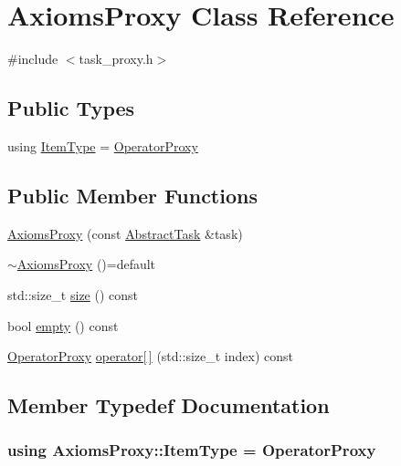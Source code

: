 \hypertarget{classAxiomsProxy}{\section{Axioms\-Proxy Class Reference}
\label{classAxiomsProxy}
}


{\ttfamily \#include $<$task\-\_\-proxy.\-h$>$}

\subsection*{Public Types}
\begin{DoxyCompactItemize}
\item 
using \hyperlink{classAxiomsProxy_abefbb803d0603832ce3784793040cc30}{Item\-Type} = \hyperlink{classOperatorProxy}{Operator\-Proxy}
\end{DoxyCompactItemize}
\subsection*{Public Member Functions}
\begin{DoxyCompactItemize}
\item 
\hyperlink{classAxiomsProxy_aa06ac71778563a60523ec3e7fae56ef1}{Axioms\-Proxy} (const \hyperlink{classAbstractTask}{Abstract\-Task} \&task)
\item 
\hyperlink{classAxiomsProxy_a1f0a596925691361d514e875546dfebc}{$\sim$\-Axioms\-Proxy} ()=default
\item 
std\-::size\-\_\-t \hyperlink{classAxiomsProxy_aea7209589c94878185298ddf3a328720}{size} () const 
\item 
bool \hyperlink{classAxiomsProxy_ab246c21d3176f9c7f2d713a1d31c65dc}{empty} () const 
\item 
\hyperlink{classOperatorProxy}{Operator\-Proxy} \hyperlink{classAxiomsProxy_ab553b5ccabf34ab61180eb4f6ce80008}{operator\mbox{[}$\,$\mbox{]}} (std\-::size\-\_\-t index) const 
\end{DoxyCompactItemize}


\subsection{Member Typedef Documentation}
\hypertarget{classAxiomsProxy_abefbb803d0603832ce3784793040cc30}{
\subsubsection[{Item\-Type}]{\setlength{\rightskip}{0pt plus 5cm}using {\bf Axioms\-Proxy\-::\-Item\-Type} =  {\bf Operator\-Proxy}}}\label{classAxiomsProxy_abefbb803d0603832ce3784793040cc30}


